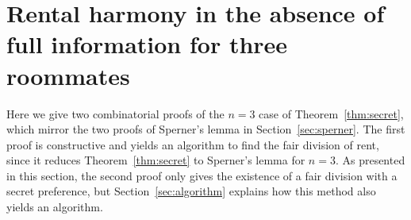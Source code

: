 \documentclass[a4paper,10pt,reqno, english]{amsart}
\theoremstyle{plain}
\theoremstyle{definition}
\begin{document}
\section{Rental harmony in the absence of full information for three roommates}
\label{sec:proof3case}

Here we give two combinatorial proofs of  the $n=3$ case of Theorem~\ref{thm:secret}, which mirror the two proofs of Sperner's lemma in Section~\ref{sec:sperner}. 
The first proof is constructive and yields an algorithm to find the fair division of rent, since it reduces Theorem~\ref{thm:secret} to Sperner's lemma for $n=3$. As presented in this section, the second proof only gives the existence of a fair division with a secret preference, but Section~\ref{sec:algorithm} explains how this method also yields an algorithm.
\end{document}
